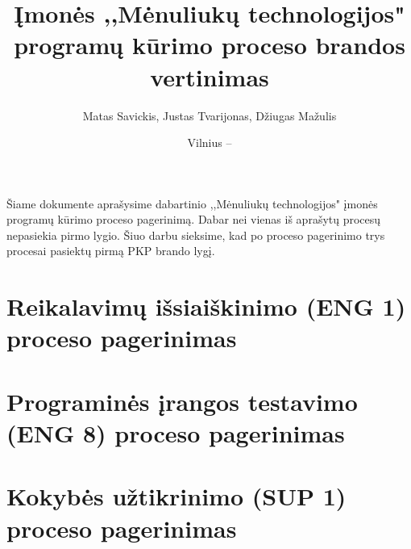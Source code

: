 \documentclass{VUMIFPSkursinis}
\title{Įmonės ,,Mėnuliukų technologijos" programų kūrimo proceso brandos vertinimas}
\author{Matas Savickis, Justas Tvarijonas, Džiugas Mažulis}
\date{Vilnius – \the\year}
\begin{document}
\maketitle

\tableofcontents

	Šiame dokumente aprašysime dabartinio ,,Mėnuliukų technologijos" įmonės programų kūrimo proceso pagerinimą. 
	Dabar nei vienas iš aprašytų procesų nepasiekia pirmo lygio.
	Šiuo darbu sieksime, kad po proceso pagerinimo trys procesai pasiektų pirmą PKP brando lygį.

\section{Reikalavimų išsiaiškinimo (ENG 1) proceso pagerinimas}
\section{Programinės įrangos testavimo (ENG 8) proceso pagerinimas}	
\section{Kokybės užtikrinimo (SUP 1) proceso pagerinimas}
\end{document}
